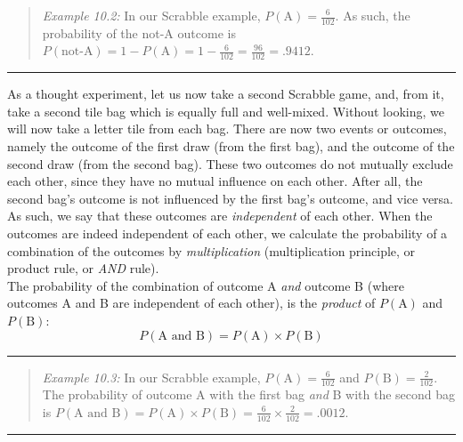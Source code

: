 \documentclass[
]{book}
\begin{document}
\begin{quote}
\emph{Example 10.2:}
In our Scrabble example, \(P(\textrm{A})=\frac{6}{102}\). As such, the probability
of the not-A outcome is
\(P(\textrm{not-A})= 1 - P(\textrm{A}) = 1 - \frac{6}{102} = \frac{96}{102} = .9412\).
\end{quote}

\begin{center}\rule{0.5\linewidth}{0.5pt}\end{center}

As a thought experiment, let us now take a second Scrabble game, and, from it, take
a second tile bag which is equally full and well-mixed.
Without looking, we will now take a letter tile from each bag. There are now two
events or outcomes, namely the outcome of the first draw (from the first
bag), and the outcome of the second draw (from the second bag).
These two outcomes do not mutually exclude each other, since they
have no mutual influence on each other. After all, the second
bag's outcome is not influenced by the first bag's outcome, and vice versa. As
such, we say that these outcomes are \emph{independent} of each other. When the outcomes
are indeed independent of each other, we calculate the probability of a
combination of the outcomes by \emph{multiplication} (multiplication
principle, or product rule, or \emph{AND} rule).\\
The probability of the combination of outcome A \emph{and} outcome B
(where outcomes A and B are independent of each other), is the
\emph{product} of \(P(\textrm{A})\) and \(P(\textrm{B})\):
\begin{equation}
    P(\textrm{A and B}) = P(\textrm{A}) \times P(\textrm{B})
  \label{eq:probability-productrule}
\end{equation}

\begin{center}\rule{0.5\linewidth}{0.5pt}\end{center}

\begin{quote}
\emph{Example 10.3:}
In our Scrabble example, \(P(\textrm{A})=\frac{6}{102}\) and
\(P(\textrm{B})=\frac{2}{102}\). The probability of outcome A with the first
bag \emph{and} B with the second bag is
\(P(\textrm{A and B})=P(\textrm{A}) \times P(\textrm{B})=\frac{6}{102} \times \frac{2}{102} = .0012\).
\end{quote}

\begin{center}\rule{0.5\linewidth}{0.5pt}\end{center}
\end{document}
